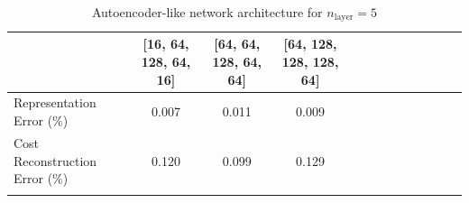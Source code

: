 \begin{table}[!ht]
\small
\centering
\begin{tabular}{ccccccccccccc}
\Xhline{3\arrayrulewidth}
\multicolumn{1}{l|}{Network Architecture}           & [16, 64, 128, 64, 16]  & [64, 64, 128, 64, 64] & [64, 128, 128, 128, 64]                     \\ \hline
\multicolumn{1}{l|}{Representation Error ($\%$)} & 0.007 & 0.011 & 0.009 \\ \hline   
\multicolumn{1}{l|}{Cost Reconstruction Error ($\%$)} & 0.120 & 0.099 & 0.129 \\ \Xhline{3\arrayrulewidth}

\end{tabular}
\caption{Autoencoder-like network architecture for $n_{\text{layer}}=5$}
\label{tab:n_layer = 5}
\end{table}